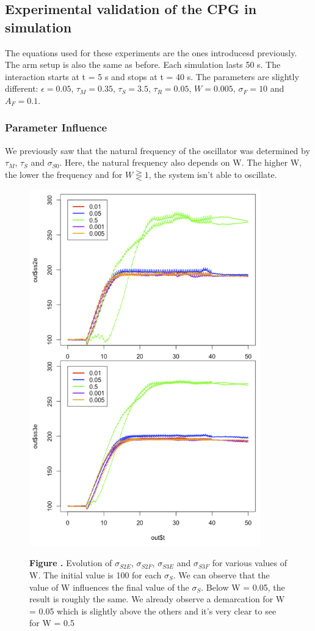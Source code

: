 \documentclass{report}
\let\Oldsubsection\subsection
\renewcommand{\subsection}{\FloatBarrier\Oldsubsection}
\let\Oldsubsubsection\subsubsection
\renewcommand{\subsubsection}{\FloatBarrier\Oldsubsubsection}
\begin{document}
\subsection{Experimental validation of the CPG in simulation}

The equations used for these experiments are the ones introducesd previously. The arm setup is also the same as before. Each simulation lasts 50 s. The interaction starts at t = 5 s and stops at t = 40 s. The parameters are slightly different: $\epsilon = 0.05$, $\tau_M = 0.35$, $\tau_S = 3.5$, $\tau_R = 0.05$, $W = 0.005$, $\sigma_F = 10$ and $A_F = 0.1$. 

\subsubsection{Parameter Influence}

We previously saw that the natural frequency of the oscillator was determined by $\tau_M$, $\tau_S$ and $\sigma_{S0}$. Here, the natural frequency also depends on W. The higher W, the lower the frequency and for $W \gtreqless 1$, the system isn't able to oscillate.

\begin{figure}[h!]
\begin{center}
\includegraphics[width=10cm]{figures/varying_W-ss.png}
\end{center}
 \textbf{\label{fig:05} Figure . }{Evolution of $\sigma_{S2E}$, $\sigma_{S2F}$, $\sigma_{S3E}$ and $\sigma_{S3F}$  for various values of W. The initial value is 100 for each $\sigma_S$. We can observe that the value of W influences the final value of the $\sigma_S$. Below W = 0.05, the result is roughly the same. We already observe a demarcation for W = 0.05 which is slightly above the others and it's very clear to see for W = 0.5}
\end{figure}
\end{document}
